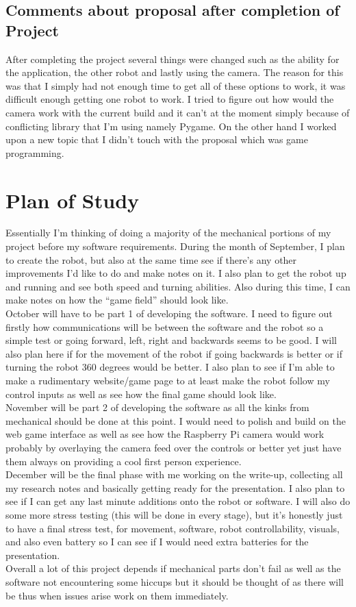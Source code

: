 \documentclass[13ptletterpaper]{paper}
\newcommand\tab[1][1cm]{\hspace*{#1}}
\begin{document}
\begin{flushleft}
	\subsection{Comments about proposal after completion of Project}
	\tab After completing the project several things were changed such as the ability for the application, the other robot and lastly using the camera. The reason for this was that I simply had not enough time to get all of these options to work, it was difficult enough getting one robot to work. I tried to figure out how would the camera work with the current build and it can't at the moment simply because of conflicting library that I'm using namely Pygame. On the other hand I worked upon a new topic that I didn't touch with the proposal which was game programming.
	\section{Plan of Study}
	\tab Essentially I’m thinking of doing a majority of the mechanical portions of my project before my software requirements.
	During the month of September, I plan to create the robot, but also at the same time see if there’s any other improvements I’d like to do and make notes on it. I also plan to get the robot up and running and see both speed and turning abilities. Also during this time, I can make notes on how the “game field” should look like.\\
	\tab October will have to be part 1 of developing the software. I need to figure out firstly how communications will be between the software and the robot so a simple test or going forward, left, right and backwards seems to be good. I will also plan here if for the movement of the robot if going backwards is better or if turning the robot 360 degrees would be better. I also plan to see if I’m able to make a rudimentary website/game page to at least make the robot follow my control inputs as well as see how the final game should look like.\\
	\tab November will be part 2 of developing the software as all the kinks from mechanical should be done at this point. I would need to polish and build on the web game interface as well as see how the Raspberry Pi camera would work probably by overlaying the camera feed over the controls or better yet just have them always on providing a cool first person experience. \\
	\tab December will be the final phase with me working on the write-up, collecting all my research notes and basically getting ready for the presentation. I also plan to see if I can get any last minute additions onto the robot or software. I will also do some more stress testing (this will be done in every stage), but it’s honestly just to have a final stress test, for movement, software, robot controllability, visuals, and also even battery so I can see if I would need extra batteries for the presentation. \\
	\tab Overall a lot of this project depends if mechanical parts don’t fail as well as the software not encountering some hiccups but it should be thought of as there will be thus when issues arise work on them immediately.\\
	

\end{flushleft}
\end{document}
